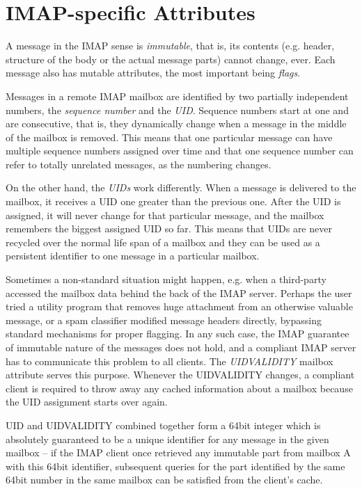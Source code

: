\documentclass[12pt,notitlepage]{report}
\begin{document}
\section{IMAP-specific Attributes}

A message in the IMAP sense is {\em immutable}, that is, its contents (e.g.
header, structure of the body or the actual message parts) cannot change, ever.
Each message also has mutable attributes, the most important being {\em flags}.

Messages in a remote IMAP mailbox are identified by two partially independent
numbers, the {\em sequence number} and the {\em UID}.  Sequence numbers start at
one and are consecutive, that is, they dynamically change when a message in the
middle of the mailbox is removed.  This means that one particular message can
have multiple sequence numbers assigned over time and that one sequence number
can refer to totally unrelated messages, as the numbering changes.

On the other hand, the {\em UIDs} work differently.  When a message is delivered
to the mailbox, it receives a UID one greater than the previous one.  After the
UID is assigned, it will never change for that particular message, and the
mailbox remembers the biggest assigned UID so far.  This means that UIDs are
never recycled over the normal life span of a mailbox and they can be used as a
persistent identifier to one message in a particular mailbox.

Sometimes a non-standard situation might happen, e.g. when a third-party
accessed the mailbox data behind the back of the IMAP server.  Perhaps the user
tried a utility program that removes huge attachment from an otherwise valuable
message, or a spam classifier modified message headers directly, bypassing
standard mechanisms for proper flagging.  In any such case, the IMAP guarantee
of immutable nature of the messages does not hold, and a compliant IMAP server
has to communicate this problem to all clients.  The {\em UIDVALIDITY} mailbox
attribute serves this purpose.  Whenever the UIDVALIDITY changes, a compliant
client is required to throw away any cached information about a mailbox because
the UID assignment starts over again.

UID and UIDVALIDITY combined together form a 64bit integer which is absolutely
guaranteed to be a unique identifier for any message in the given mailbox -- if
the IMAP client once retrieved any immutable part from mailbox A with this 64bit
identifier, subsequent queries for the part identified by the same 64bit number
in the same mailbox can be satisfied from the client's cache.
\end{document}
